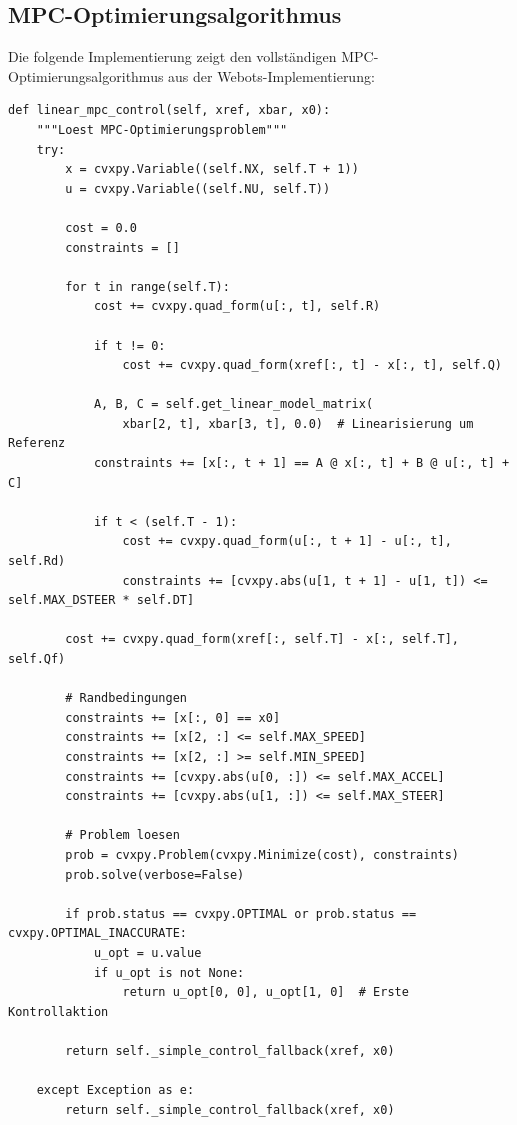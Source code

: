 \newpage
\subsection{MPC-Optimierungsalgorithmus}

Die folgende Implementierung zeigt den vollständigen MPC-Optimierungsalgorithmus aus der Webots-Implementierung:

\begin{lstlisting}[style=python,caption={MPC-Optimierungsalgorithmus in der Webots-Implementierung},label={lst:webots_mpc_solver_appendix}]
def linear_mpc_control(self, xref, xbar, x0):
    """Loest MPC-Optimierungsproblem"""
    try:
        x = cvxpy.Variable((self.NX, self.T + 1))
        u = cvxpy.Variable((self.NU, self.T))
        
        cost = 0.0
        constraints = []
        
        for t in range(self.T):
            cost += cvxpy.quad_form(u[:, t], self.R)
            
            if t != 0:
                cost += cvxpy.quad_form(xref[:, t] - x[:, t], self.Q)
            
            A, B, C = self.get_linear_model_matrix(
                xbar[2, t], xbar[3, t], 0.0)  # Linearisierung um Referenz
            constraints += [x[:, t + 1] == A @ x[:, t] + B @ u[:, t] + C]
            
            if t < (self.T - 1):
                cost += cvxpy.quad_form(u[:, t + 1] - u[:, t], self.Rd)
                constraints += [cvxpy.abs(u[1, t + 1] - u[1, t]) <= self.MAX_DSTEER * self.DT]
        
        cost += cvxpy.quad_form(xref[:, self.T] - x[:, self.T], self.Qf)
        
        # Randbedingungen
        constraints += [x[:, 0] == x0]
        constraints += [x[2, :] <= self.MAX_SPEED]
        constraints += [x[2, :] >= self.MIN_SPEED]
        constraints += [cvxpy.abs(u[0, :]) <= self.MAX_ACCEL]
        constraints += [cvxpy.abs(u[1, :]) <= self.MAX_STEER]
        
        # Problem loesen
        prob = cvxpy.Problem(cvxpy.Minimize(cost), constraints)
        prob.solve(verbose=False)
        
        if prob.status == cvxpy.OPTIMAL or prob.status == cvxpy.OPTIMAL_INACCURATE:
            u_opt = u.value
            if u_opt is not None:
                return u_opt[0, 0], u_opt[1, 0]  # Erste Kontrollaktion
        
        return self._simple_control_fallback(xref, x0)
        
    except Exception as e:
        return self._simple_control_fallback(xref, x0)
\end{lstlisting}
